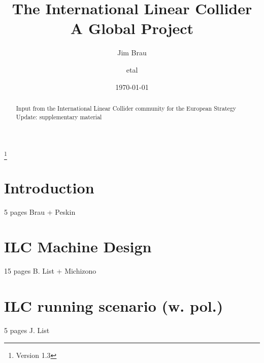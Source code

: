\documentclass[%
 reprint,
 amsmath,amssymb,
 aps,
]{revtex4-1}
\begin{document}

\title{The International Linear Collider \\ A Global Project}%
\thanks{Version 1.3}%

\author{Jim Brau}
\author{etal}%
%


\date{\today}%

\begin{abstract}
Input from the International Linear Collider community for the European Strategy Update: supplementary material

\end{abstract}

\maketitle


\section{\label{sec:intro}Introduction}
   5 pages Brau + Peskin
   
   

   
\section{\label{sec:ilc}ILC Machine Design}

  15 pages B. List + Michizono
  

  
\section{\label{sec:runscenarios}ILC running scenario (w. pol.)  }
   5 pages J. List
   
\end{document}
